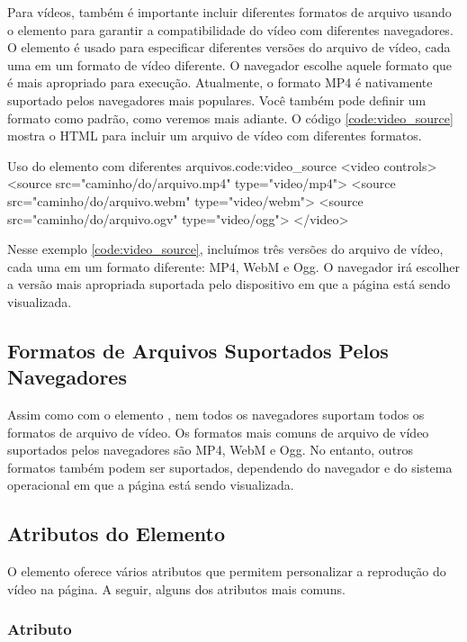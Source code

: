 Para vídeos, também é importante incluir diferentes formatos de arquivo usando o elemento  para garantir a compatibilidade do vídeo com diferentes navegadores. O elemento  é usado para especificar diferentes versões do arquivo de vídeo, cada uma em um formato de vídeo diferente. O navegador escolhe aquele formato que é mais apropriado para execução. Atualmente, o formato MP4 é nativamente suportado pelos navegadores mais populares. Você também pode definir um formato como padrão, como veremos mais adiante. O código \ref{code:video_source} mostra o HTML para incluir um arquivo de vídeo com diferentes formatos.

\begin{htmlcode}{Uso do elemento  com diferentes arquivos.}{code:video_source}
<video controls>
  <source src="caminho/do/arquivo.mp4" type="video/mp4">
  <source src="caminho/do/arquivo.webm" type="video/webm">
  <source src="caminho/do/arquivo.ogv" type="video/ogg">
</video>
\end{htmlcode}

Nesse exemplo \ref{code:video_source}, incluímos três versões do arquivo de vídeo, cada uma em um formato diferente: MP4, WebM e Ogg. O navegador irá escolher a versão mais apropriada suportada pelo dispositivo em que a página está sendo visualizada.

\subsection{Formatos de Arquivos Suportados Pelos Navegadores}

Assim como com o elemento , nem todos os navegadores suportam todos os formatos de arquivo de vídeo. Os formatos mais comuns de arquivo de vídeo suportados pelos navegadores são MP4, WebM e Ogg. No entanto, outros formatos também podem ser suportados, dependendo do navegador e do sistema operacional em que a página está sendo visualizada.

\subsection{Atributos do Elemento }

O elemento  oferece vários atributos que permitem personalizar a reprodução do vídeo na página. A seguir, alguns dos atributos mais comuns.

\subsubsection{Atributo }

